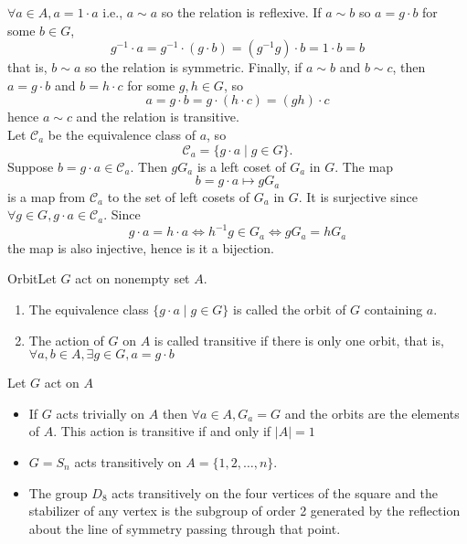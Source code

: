 \documentclass{report}
\newcommand{\ex}[2]{\begin{Example}{#1}{}#2\end{Example}}
\newcommand{\dfn}[2]{\begin{Definition}[colbacktitle=red!75!black]{#1}{}#2\end{Definition}}
\newenvironment{myproof}[1][\proofname]{%
	\proof[\bfseries #1: ]%
}{\endproof}
\newcommand{\mcC}{\mathcal{C}}	\newcommand{\mcD}{\mathcal{D}}
\begin{document}
\begin{myproof}
    $\forall a \in A, a = 1 \cdot a$ i.e., $a \sim a$ so the relation is reflexive. If $a \sim b$ so $a = g\cdot b$ for some $b \in G$, 
    $$g^{-1} \cdot a = g^{-1} \cdot ( g \cdot b) = (g^{-1} g) \cdot b = 1 \cdot b = b$$
    that is, $b \sim a$ so the relation is symmetric. Finally, if $a \sim b$ and $b \sim c$, then $a = g \cdot b$ and $b = h \cdot c$ for some $g,h \in G$, so 
    $$a = g\cdot b = g \cdot (h \cdot c) = (gh) \cdot c$$
    hence $a \sim c$ and the relation is transitive. \\
    Let $\mcC_a$ be the equivalence class of $a$, so
    $$\mcC_a = \{g \cdot a \mid g \in G \}.$$
    Suppose $b = g \cdot a \in \mcC_a$. Then $g G_a$ is a left coset of $G_a$ in $G$. The map 
    $$b = g \cdot a \mapsto gG_a$$
    is a map from $\mcC_a$ to the set of left cosets of $G_a$ in $G$. It is surjective since $\forall g \in G, g\cdot a \in \mcC_a$. Since
    $$g \cdot a = h\cdot a\iff h^{-1}g \in G_a \iff gG_a = hG_a $$
    the map is also injective, hence is it a bijection. 
\end{myproof}
\dfn{Orbit}{Let $G$ act on nonempty set $A$. 
\begin{enumerate}
    \item The equivalence class $\{g \cdot a \mid g \in G\}$ is called the orbit of $G$ containing $a$. 
    \item The action of $G$ on $A$ is called transitive if there is only one orbit, that is, $\forall a,b \in A, \exists g \in G , a = g \cdot b$
\end{enumerate}}
\ex{}{Let $G$ act on $A$
\begin{itemize}
    \item If $G$ acts trivially on $A$ then $\forall a \in A, G_a = G$ and the orbits are the elements of $A$. This action is transitive if and only if $|A| = 1$
    \item $G = S_n$ acts transitively on $A = \{1, 2, \dots , n\}$. 
    \item The group $D_8$ acts transitively on the four vertices of the square and the stabilizer of any vertex is the subgroup of order 2 generated by the reflection about the line of symmetry passing through that point. 
\end{itemize}}
\end{document}
